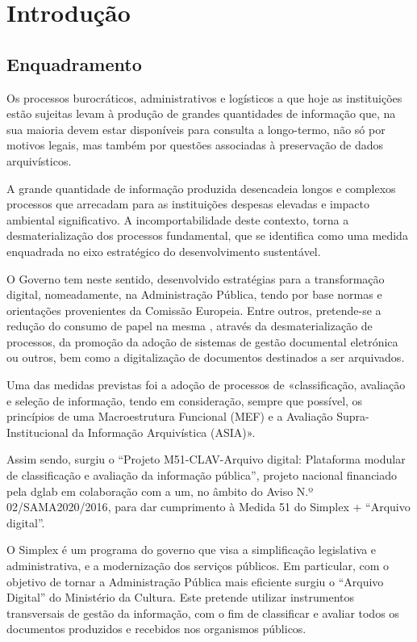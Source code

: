\chapter{Introdução}

\section{Enquadramento}

Os processos burocráticos, administrativos e logísticos a que hoje as instituições estão sujeitas levam à produção de grandes quantidades de informação que, na sua maioria devem estar disponíveis para consulta a longo-termo, não só por motivos legais, mas também por questões associadas à preservação de dados arquivísticos. 

A grande quantidade de informação produzida desencadeia longos e complexos processos que arrecadam para as instituições despesas elevadas e impacto ambiental significativo. A incomportabilidade deste contexto, torna a desmaterialização dos processos fundamental, que se identifica como uma medida enquadrada no eixo estratégico do desenvolvimento sustentável.\cite{artigoOECD}

O Governo tem neste sentido, desenvolvido estratégias para a transformação digital, nomeadamente, na Administração Pública, tendo por base normas e orientações provenientes da Comissão Europeia. Entre outros, pretende-se a redução do consumo de papel na mesma \cite{papZero}, através da desmaterialização de processos, da promoção da adoção de sistemas de gestão documental eletrónica ou outros, bem como a digitalização de documentos destinados a ser arquivados. 

Uma das medidas previstas foi a adoção de processos de «classificação, avaliação e seleção de informação, tendo em consideração, sempre que possível, os princípios de uma Macroestrutura Funcional (MEF) e a Avaliação Supra-Institucional da Informação Arquivística (ASIA)».\cite{congressoBAD}\cite{confGIA}

Assim sendo, surgiu o “Projeto M51-CLAV-Arquivo digital: Plataforma modular de classificação e avaliação da informação pública”, projeto nacional financiado pela \gls{dglab} em colaboração com a \gls{um}, no âmbito do Aviso N.º 02/SAMA2020/2016\cite{compete2020}, para dar cumprimento à Medida 51 do Simplex + “Arquivo digital”. 

O Simplex é um programa do governo que visa a simplificação legislativa e administrativa, e a modernização dos serviços públicos. Em particular, com o objetivo de tornar a Administração Pública mais eficiente surgiu o “Arquivo Digital” do Ministério da Cultura. Este pretende utilizar instrumentos transversais de gestão da informação, com o fim de classificar e avaliar todos os documentos produzidos e recebidos nos organismos públicos. 

